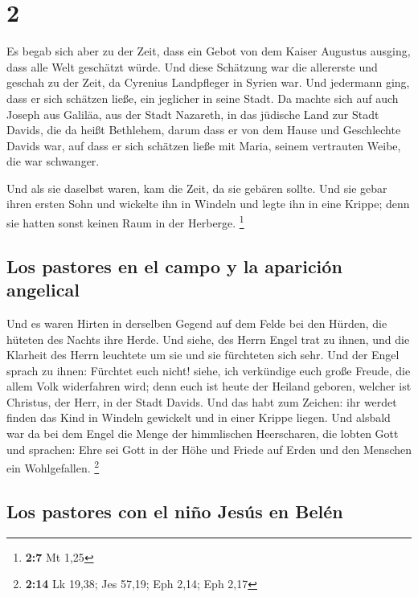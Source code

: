 \hypertarget{section-1}{%
\section{2}\label{section-1}}

 Es begab sich aber zu der Zeit, dass ein Gebot von dem
Kaiser Augustus ausging, dass alle Welt geschätzt würde. 
Und diese Schätzung war die allererste und geschah zu der Zeit, da
Cyrenius Landpfleger in Syrien war.  Und jedermann ging,
dass er sich schätzen ließe, ein jeglicher in seine Stadt.
 Da machte sich auf auch Joseph aus Galiläa, aus der Stadt
Nazareth, in das jüdische Land zur Stadt Davids, die da heißt Bethlehem,
darum dass er von dem Hause und Geschlechte Davids war, 
auf dass er sich schätzen ließe mit Maria, seinem vertrauten Weibe, die
war schwanger.

 Und als sie daselbst waren, kam die Zeit, da sie gebären
sollte.  Und sie gebar ihren ersten Sohn und wickelte ihn
in Windeln und legte ihn in eine Krippe; denn sie hatten sonst keinen
Raum in der Herberge. \footnote{\textbf{2:7} Mt 1,25}

\hypertarget{los-pastores-en-el-campo-y-la-apariciuxf3n-angelical}{%
\subsection{Los pastores en el campo y la aparición
angelical}\label{los-pastores-en-el-campo-y-la-apariciuxf3n-angelical}}

 Und es waren Hirten in derselben Gegend auf dem Felde bei
den Hürden, die hüteten des Nachts ihre Herde.  Und siehe,
des Herrn Engel trat zu ihnen, und die Klarheit des Herrn leuchtete um
sie und sie fürchteten sich sehr.  Und der Engel sprach
zu ihnen: Fürchtet euch nicht! siehe, ich verkündige euch große Freude,
die allem Volk widerfahren wird;  denn euch ist heute der
Heiland geboren, welcher ist Christus, der Herr, in der Stadt Davids.
 Und das habt zum Zeichen: ihr werdet finden das Kind in
Windeln gewickelt und in einer Krippe liegen.  Und
alsbald war da bei dem Engel die Menge der himmlischen Heerscharen, die
lobten Gott und sprachen:  Ehre sei Gott in der Höhe und
Friede auf Erden und den Menschen ein Wohlgefallen. \footnote{\textbf{2:14}
  Lk 19,38; Jes 57,19; Eph 2,14; Eph 2,17}

\hypertarget{los-pastores-con-el-niuxf1o-jesuxfas-en-beluxe9n}{%
\subsection{Los pastores con el niño Jesús en
Belén}\label{los-pastores-con-el-niuxf1o-jesuxfas-en-beluxe9n}}

